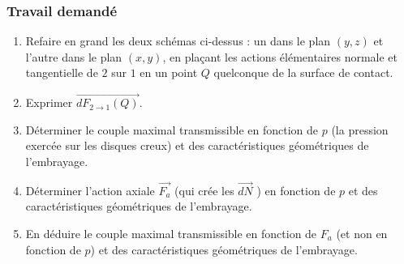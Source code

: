 \subsubsection{Travail demandé}
\begin{enumerate}
\item Refaire en grand les deux schémas ci-dessus : un dans le plan $(y, z)$ et l’autre dans le plan $(x, y)$, en plaçant les actions élémentaires normale et tangentielle de $2$ sur $1$ en un point $Q$ quelconque de la surface de contact.
\item Exprimer $\overrightarrow{dF_{2\rightarrow1}(Q)}$.
\item Déterminer le couple maximal transmissible en fonction de $p$ (la pression exercée sur les disques creux) et des caractéristiques géométriques de l’embrayage.
\item Déterminer l’action axiale $\overrightarrow{F_a}$ (qui crée les $\overrightarrow{dN}$ ) en fonction de $p$ et des caractéristiques géométriques de l’embrayage.
\item En déduire le couple maximal transmissible en fonction de $F_a$ (et non en fonction de $p$) et des caractéristiques géométriques de l'embrayage.
\end{enumerate}

\newpage

